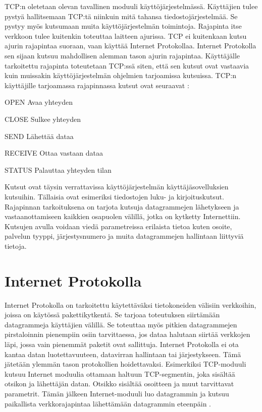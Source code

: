 \documentclass[utf8]{gradu3}
\begin{document}
TCP:n oletetaan olevan tavallinen moduuli käyttöjärjestelmässä. Käyttäjien tulee pystyä hallitsemaan TCP:tä niinkuin mitä tahansa tiedostojärjestelmää. Se pystyy myös kutsumaan muita käyttöjärjestelmän toimintoja. Rajapinta itse verkkoon tulee kuitenkin toteuttaa laitteen ajurissa. TCP ei kuitenkaan kutsu ajurin rajapintaa suoraan, vaan käyttää Internet Protokollaa. Internet Protokolla sen sijaan kutsuu mahdollisen alemman tason ajurin rajapintaa. Käyttäjälle tarkoitettu rajapinta toteutetaan TCP:ssä siten, että sen kutsut ovat vastaavia kuin muissakin käyttöjärjestelmän ohjelmien tarjoamissa kutsuissa.  TCP:n käyttäjille tarjoamassa rajapinnassa kutsut ovat seuraavat \parencite{tcp2_3}:

\begin{desclist}
\item[OPEN] Avaa yhteyden
\item[CLOSE] Sulkee yhteyden
\item[SEND] Lähettää dataa
\item[RECEIVE] Ottaa vastaan dataa
\item[STATUS] Palauttaa yhteyden tilan
\end{desclist}

Kutsut ovat täysin verrattavissa käyttöjärjestelmän käyttäjäsovelluksien kutsuihin. Tällaisia ovat esimeriksi tiedostojen luku- ja kirjoituskutsut. Rajapinnan tarkoituksena on tarjota kutsuja datagrammejen lähetykseen ja vastaanottamiseen kaikkien osapuolen välillä, jotka on kytketty Internettiin. Kutsujen avulla voidaan viedä parametreissa erilaista tietoa kuten osoite, palvelun tyyppi, järjestysnumero ja muita datagrammejen hallintaan liittyviä tietoja. 

\section{Internet Protokolla}

Internet Protokolla on tarkoitettu käytettäväksi tietokoneiden välisiin verkkoihin, joissa on käytössä pakettikytkentä. Se tarjoaa toteutuksen siirtämään datagrammeja käyttäjien välillä. Se toteuttaa myös pitkien datagrammejen pirstaloinnin pienempiin osiin tarvittaessa, jos dataa halutaan siirtää verkkojen läpi, jossa vain pienemmät paketit ovat sallittuja. Internet Protokolla ei ota kantaa datan luotettavuuteen, datavirran hallintaan tai järjestykseen. Tämä jätetään ylemmän tason protokollien hoidettavaksi. Esimerkiksi TCP-moduuli kutsuu Internet moduulia ottamaan haltuun TCP-segmentin, joka sisältää otsikon ja lähettäjän datan. Otsikko sisältää osoitteen ja muut tarvittavat parametrit. Tämän jälkeen Internet-moduuli luo datagrammin ja kutsuu paikallista verkkorajapintaa lähettämään datagrammin eteenpäin \parencite{internet_protocol}.
\end{document}
